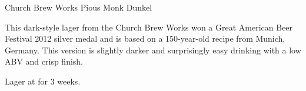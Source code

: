 \stylesection{\stylemunichdunkel}

\begin{recipe}{Church Brew Works Pious Monk Dunkel}

\begin{aboutblock}
This dark-style lager from the Church Brew Works won a Great American Beer
Festival 2012 silver medal and is based on a 150-year-old recipe from Munich,
Germany. This version is slightly darker and surprisingly easy drinking with
a low ABV and crisp finish. \sourceaha
\end{aboutblock}


\begin{methodandtiming}
 
\begin{mashsteps}
\mashdecoctthick{}
\mashdecoctboil{}

\end{mashsteps}

\begin{fermentationsteps}
\end{fermentationsteps}

\begin{directions}
Lager at  for 3 weeks.
\end{directions}

\end{methodandtiming}

\recipebreak

\begin{ingredientsblock}

\begin{malts}
\end{malts}

\begin{hops}
\end{hops}


\begin{twists}
\end{twists}

\end{ingredientsblock}

\end{recipe}
